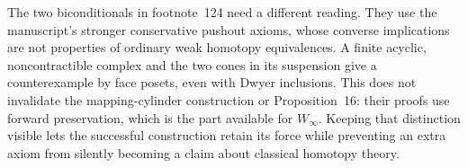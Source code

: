 The two biconditionals in footnote~124 need a different reading. They use the manuscript's stronger conservative pushout axioms, whose converse implications are not properties of ordinary weak homotopy equivalences. A finite acyclic, noncontractible complex and the two cones in its suspension give a counterexample by face posets, even with Dwyer inclusions. This does not invalidate the mapping-cylinder construction or Proposition~16: their proofs use forward preservation, which is the part available for $W_\infty$. Keeping that distinction visible lets the successful construction retain its force while preventing an extra axiom from silently becoming a claim about classical homotopy theory.

